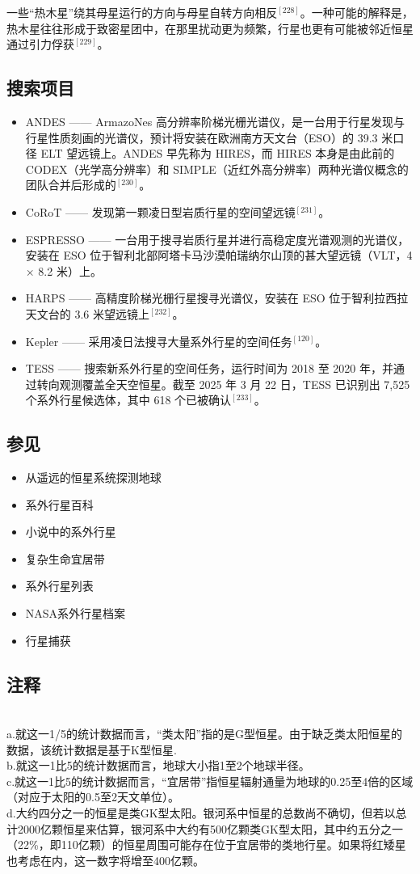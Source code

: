 一些“热木星”绕其母星运行的方向与母星自转方向相反$^{[228]}$。一种可能的解释是，热木星往往形成于致密星团中，在那里扰动更为频繁，行星也更有可能被邻近恒星通过引力俘获$^{[229]}$。
\subsection{搜索项目}
\begin{itemize}
\item ANDES —— ArmazoNes 高分辨率阶梯光栅光谱仪，是一台用于行星发现与行星性质刻画的光谱仪，预计将安装在欧洲南方天文台（ESO）的 39.3 米口径 ELT 望远镜上。ANDES 早先称为 HIRES，而 HIRES 本身是由此前的 CODEX（光学高分辨率）和 SIMPLE（近红外高分辨率）两种光谱仪概念的团队合并后形成的$^{[230]}$。
\item CoRoT —— 发现第一颗凌日型岩质行星的空间望远镜$^{[231]}$。
\item ESPRESSO —— 一台用于搜寻岩质行星并进行高稳定度光谱观测的光谱仪，安装在 ESO 位于智利北部阿塔卡马沙漠帕瑞纳尔山顶的甚大望远镜（VLT，4 × 8.2 米）上。
\item HARPS —— 高精度阶梯光栅行星搜寻光谱仪，安装在 ESO 位于智利拉西拉天文台的 3.6 米望远镜上$^{[232]}$。
\item Kepler —— 采用凌日法搜寻大量系外行星的空间任务$^{[120]}$。
\item TESS —— 搜索新系外行星的空间任务，运行时间为 2018 至 2020 年，并通过转向观测覆盖全天空恒星。截至 2025 年 3 月 22 日，TESS 已识别出 7,525 个系外行星候选体，其中 618 个已被确认$^{[233]}$。
\end{itemize}
\subsection{参见}
\begin{itemize}
\item 从遥远的恒星系统探测地球
\item 系外行星百科
\item 小说中的系外行星
\item 复杂生命宜居带
\item 系外行星列表
\item NASA系外行星档案
\item 行星捕获
\end{itemize}
\subsection{注释}\\
a.就这一1/5的统计数据而言，“类太阳”指的是G型恒星。由于缺乏类太阳恒星的数据，该统计数据是基于K型恒星.\\
b.就这一1比5的统计数据而言，地球大小指1至2个地球半径。\\
c.就这一1比5的统计数据而言，“宜居带”指恒星辐射通量为地球的0.25至4倍的区域（对应于太阳的0.5至2天文单位）。\\
d.大约四分之一的恒星是类GK型太阳。银河系中恒星的总数尚不确切，但若以总计2000亿颗恒星来估算，银河系中大约有500亿颗类GK型太阳，其中约五分之一（22\%，即110亿颗）的恒星周围可能存在位于宜居带的类地行星。如果将红矮星也考虑在内，这一数字将增至400亿颗。